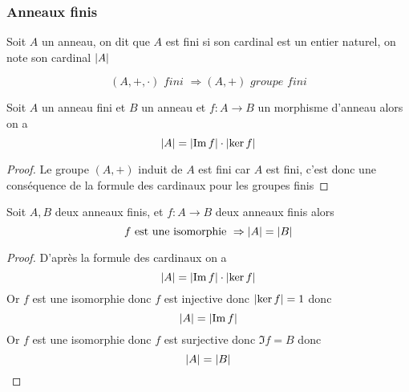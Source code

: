 \documentclass[11pt,colorlinks]{book}
\theoremstyle{mytheoremstyle}
\theoremstyle{mytheoremstyle}
\theoremstyle{mytheoremstyle}
\theoremstyle{mytheoremstyle}
\theoremstyle{mytheoremstyle}
\theoremstyle{mytheoremstyle}
\theoremstyle{mytheoremstyle}
\theoremstyle{mytheoremstyle}
\theoremstyle{myproblemstyle}
\begin{document}
\subsubsection{Anneaux finis}
\begin{definition}
  Soit $A$ un anneau, on dit que $A$ est fini si son cardinal est un entier naturel, on note son cardinal $\abs{A}$
\end{definition}
\begin{prop}
  \begin{equation*}
    (A,+,\cdot) \textit{ fini } \Rightarrow (A,+) \textit{ groupe fini} 
  \end{equation*}
\end{prop}
\begin{theorem}
  Soit $A$ un anneau fini et $B$ un anneau et $f : A \to B$ un morphisme d'anneau alors on a 
  \begin{equation*}
    \abs{A} = \abs{\Im f} \cdot \abs{\ker f}
  \end{equation*}
  \begin{proof}
    Le groupe $(A,+)$ induit de $A$ est fini car $A$ est fini, c'est donc une conséquence de la formule des cardinaux pour les 
    groupes finis
  \end{proof}
\end{theorem}
\begin{prop}
  Soit $A,B$ deux anneaux finis, et $f : A \to B$ deux anneaux finis alors 
  \begin{equation*}
    f \text{ est une isomorphie } \Rightarrow \abs{A} = \abs{B}
  \end{equation*}
  \begin{proof}
    D'après la formule des cardinaux on a 
    \begin{equation*}
      \abs{A} = \abs{\Im f} \cdot \abs{\ker f}
    \end{equation*}
    Or $f$ est une isomorphie donc $f$ est injective donc $\abs{\ker f} = 1$ donc 
    \begin{equation*}
      \abs{A} = \abs{\Im f}
    \end{equation*}
    Or $f$ est une isomorphie donc $f$ est surjective donc $\Im f = B$ donc 
    \begin{equation*}
      \abs{A} = \abs{B}
    \end{equation*}
  \end{proof}
\end{prop}
\end{document}
